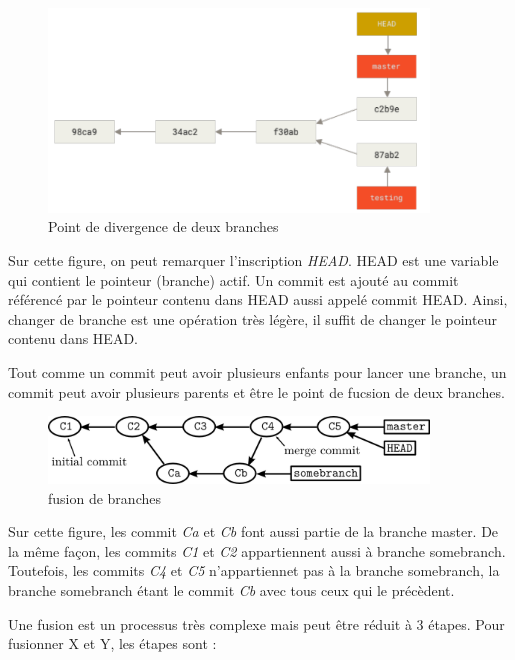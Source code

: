 \documentclass[a4paper, 12pt]{article}
\begin{document}
    \begin{figure}[H]
        \centering
        \includegraphics[width=0.9\textwidth]{figs/branches_HEAD.png}
        \caption{Point de divergence de deux branches}
        \label{git:branchdiverg}
    \end{figure}

    Sur cette figure, on peut remarquer l'inscription \textit{HEAD}. HEAD est
    une variable qui contient le pointeur (branche) actif. Un commit est ajouté
    au commit référencé par le pointeur contenu dans HEAD aussi appelé commit
    HEAD. Ainsi, changer de branche est une opération très légère, il suffit de
    changer le pointeur contenu dans HEAD.

    Tout comme un commit peut avoir plusieurs enfants pour lancer une branche,
    un commit peut avoir plusieurs parents et être le point de fucsion de
    deux branches.

    \begin{figure}[H]
        \centering
        \includegraphics[width=0.9\textwidth]{figs/brancheshistory.png}
        \caption{fusion de branches}
        \label{fig:fusion}
    \end{figure}
    Sur cette figure, les commit \emph{Ca} et \emph{Cb} font aussi partie de la
    branche master. De la même façon, les commits \emph{C1} et \emph{C2}
    appartiennent aussi à branche somebranch. Toutefois, les commits \emph{C4}
    et \emph{C5} n'appartiennet pas à la branche somebranch, la branche
    somebranch étant le commit \emph{Cb} avec tous ceux qui le précèdent.

    Une fusion est un processus très complexe mais peut être réduit à 3 étapes.
    Pour fusionner X et Y, les étapes sont :
\end{document}
